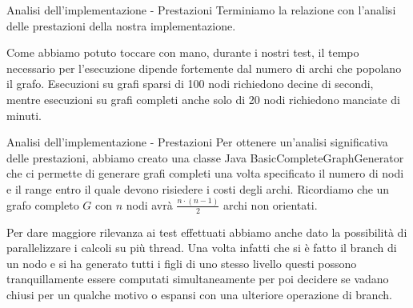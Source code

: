 \documentclass[10pt]{beamer}
\begin{document}
\begin{frame}{Analisi dell'implementazione - Prestazioni}
    Terminiamo la relazione con l'analisi delle prestazioni della nostra implementazione.
    
    Come abbiamo potuto toccare con mano, durante i nostri test, il tempo necessario per l'esecuzione dipende fortemente dal numero di archi che popolano il grafo. Esecuzioni su grafi sparsi di 100 nodi richiedono decine di secondi, mentre esecuzioni su grafi completi anche solo di 20 nodi richiedono manciate di minuti.
\end{frame}

\begin{frame}{Analisi dell'implementazione - Prestazioni}
    Per ottenere un'analisi significativa delle prestazioni, abbiamo creato una classe Java {\selectfont BasicCompleteGraphGenerator} che ci permette di generare grafi completi una volta specificato il numero di nodi e il range entro il quale devono risiedere i costi degli archi. Ricordiamo che un grafo completo $G$ con $n$ nodi avrà $\frac{n\cdot (n-1)}{2}$ archi non orientati.
    
    
    Per dare maggiore rilevanza ai test effettuati abbiamo anche dato la possibilità di parallelizzare i calcoli su più thread. Una volta infatti che si è fatto il branch di un nodo e si ha generato tutti i figli di uno stesso livello questi possono tranquillamente essere computati simultaneamente per poi decidere se vadano chiusi per un qualche motivo o espansi con una ulteriore operazione di branch.
\end{frame}
\end{document}
